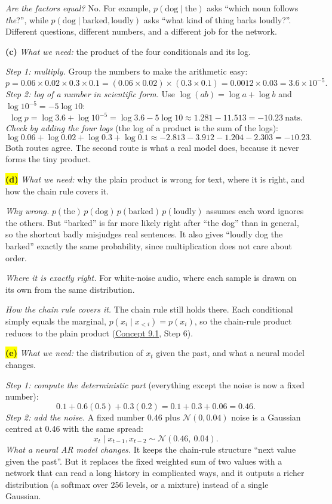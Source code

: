 \documentclass[12pt,a4paper]{article}
\begin{document}
\emph{Are the factors equal?} No. For example, $p(\text{dog}\mid\text{the})$ asks ``which noun follows \emph{the}?'', while $p(\text{dog}\mid\text{barked},\text{loudly})$ asks ``what kind of thing barks loudly?''. Different questions, different numbers, and a different job for the network.

\textbf{(c)} \emph{What we need:} the product of the four conditionals and its log.

\emph{Step 1: multiply.} Group the numbers to make the arithmetic easy:
\[
p=0.06\times0.02\times0.3\times0.1=(0.06\times0.02)\times(0.3\times0.1)=0.0012\times0.03=3.6\times10^{-5}.
\]
\emph{Step 2: log of a number in scientific form.} Use $\log(ab)=\log a+\log b$ and $\log10^{-5}=-5\log10$:
\[
\log p=\log3.6+\log10^{-5}=\log3.6-5\log10\approx1.281-11.513=-10.23\ \text{nats}.
\]
\emph{Check by adding the four logs} (the log of a product is the sum of the logs):
\[
\log0.06+\log0.02+\log0.3+\log0.1\approx-2.813-3.912-1.204-2.303=-10.23 .
\]
Both routes agree. The second route is what a real model does, because it never forms the tiny product.

\colorbox{yellow}{\textbf{(d)}} \emph{What we need:} why the plain product is wrong for text, where it is right, and how the chain rule covers it.

\emph{Why wrong.} $p(\text{the})\,p(\text{dog})\,p(\text{barked})\,p(\text{loudly})$ assumes each word ignores the others. But ``barked'' is far more likely right after ``the dog'' than in general, so the shortcut badly misjudges real sentences. It also gives ``loudly dog the barked'' exactly the same probability, since multiplication does not care about order.

\emph{Where it is exactly right.} For white-noise audio, where each sample is drawn on its own from the same distribution.

\emph{How the chain rule covers it.} The chain rule still holds there. Each conditional simply equals the marginal, $p(x_i\mid x_{<i})=p(x_i)$, so the chain-rule product reduces to the plain product (\hyperref[c9-1]{Concept 9.1}, Step 6).

\colorbox{yellow}{\textbf{(e)}} \emph{What we need:} the distribution of $x_t$ given the past, and what a neural model changes.

\emph{Step 1: compute the deterministic part} (everything except the noise is now a fixed number):
\[
0.1+0.6(0.5)+0.3(0.2)=0.1+0.3+0.06=0.46 .
\]
\emph{Step 2: add the noise.} A fixed number 0.46 plus $\mathcal{N}(0,0.04)$ noise is a Gaussian centred at 0.46 with the same spread:
\[
x_t\mid x_{t-1},x_{t-2}\sim\mathcal{N}(0.46,\ 0.04).
\]
\emph{What a neural AR model changes.} It keeps the chain-rule structure ``next value given the past''. But it replaces the fixed weighted sum of two values with a network that can read a long history in complicated ways, and it outputs a richer distribution (a softmax over 256 levels, or a mixture) instead of a single Gaussian.
\end{document}

